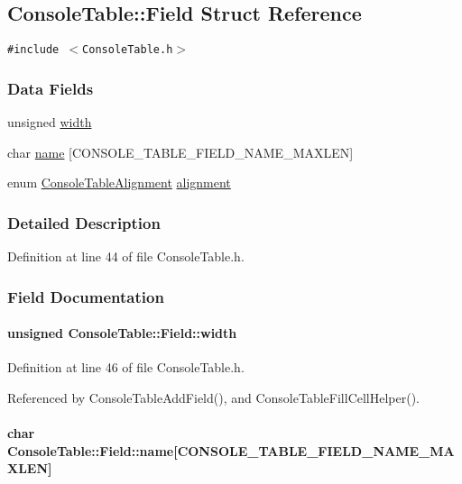 \hypertarget{structConsoleTable_1_1Field}{
\subsection{ConsoleTable::Field Struct Reference}
\label{structConsoleTable_1_1Field}
}
{\tt \#include $<$ConsoleTable.h$>$}

\subsubsection*{Data Fields}
\begin{CompactItemize}
\item 
unsigned \hyperlink{structConsoleTable_1_1Field_beea415362718a8e706251710c89d304}{width}
\item 
char \hyperlink{structConsoleTable_1_1Field_6ab364e0f78438e6629dbbfb944e0a10}{name} \mbox{[}CONSOLE\_\-TABLE\_\-FIELD\_\-NAME\_\-MAXLEN\mbox{]}
\item 
enum \hyperlink{ConsoleTable_8h_b5b27d58bf82fd9061aad8020009ab08}{ConsoleTableAlignment} \hyperlink{structConsoleTable_1_1Field_a5b961688b7ae859cdc27f45e0df0ac2}{alignment}
\end{CompactItemize}


\subsubsection{Detailed Description}


Definition at line 44 of file ConsoleTable.h.

\subsubsection{Field Documentation}
\hypertarget{structConsoleTable_1_1Field_beea415362718a8e706251710c89d304}{
\paragraph[width]{\setlength{\rightskip}{0pt plus 5cm}unsigned {\bf ConsoleTable::Field::width}}\hfill}
\label{structConsoleTable_1_1Field_beea415362718a8e706251710c89d304}




Definition at line 46 of file ConsoleTable.h.

Referenced by ConsoleTableAddField(), and ConsoleTableFillCellHelper().\hypertarget{structConsoleTable_1_1Field_6ab364e0f78438e6629dbbfb944e0a10}{
\paragraph[name]{\setlength{\rightskip}{0pt plus 5cm}char {\bf ConsoleTable::Field::name}\mbox{[}CONSOLE\_\-TABLE\_\-FIELD\_\-NAME\_\-MAXLEN\mbox{]}}\hfill}
\label{structConsoleTable_1_1Field_6ab364e0f78438e6629dbbfb944e0a10}




